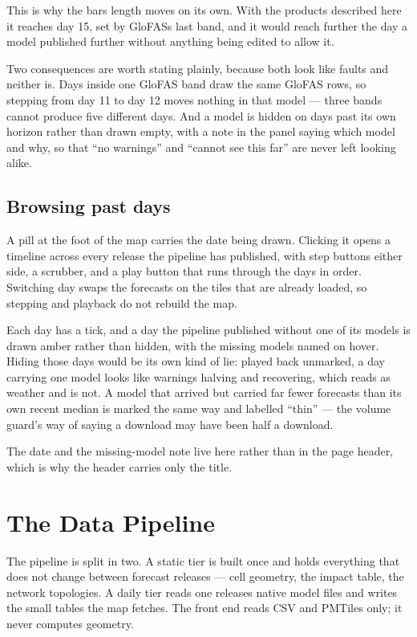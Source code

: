 This is why the bar\textquotesingle s length moves on its own.
With the products described here it reaches day 15, set by GloFAS\textquotesingle s last band, and it would reach further the day a model published further without anything being edited to allow it.

Two consequences are worth stating plainly, because both look like faults and neither is.
Days inside one GloFAS band draw the same GloFAS rows, so stepping from day 11 to day 12 moves nothing in that model --- three bands cannot produce five different days.
And a model is hidden on days past its own horizon rather than drawn empty, with a note in the panel saying which model and why, so that ``no warnings'' and ``cannot see this far'' are never left looking alike.

\subsection{Browsing past days}\label{browsing-past-days}

A pill at the foot of the map carries the date being drawn.
Clicking it opens a timeline across every release the pipeline has published, with step buttons either side, a scrubber, and a play button that runs through the days in order.
Switching day swaps the forecasts on the tiles that are already loaded, so stepping and playback do not rebuild the map.

Each day has a tick, and a day the pipeline published without one of its models is drawn amber rather than hidden, with the missing models named on hover.
Hiding those days would be its own kind of lie: played back unmarked, a day carrying one model looks like warnings halving and recovering, which reads as weather and is not.
A model that arrived but carried far fewer forecasts than its own recent median is marked the same way and labelled ``thin'' --- the volume guard's way of saying a download may have been half a download.

The date and the missing-model note live here rather than in the page header, which is why the header carries only the title.

\section{The Data Pipeline}\label{the-data-pipeline}

The pipeline is split in two.
A static tier is built once and holds everything that does not change between forecast releases --- cell geometry, the impact table, the network topologies.
A daily tier reads one release\textquotesingle s native model files and writes the small tables the map fetches.
The front end reads CSV and PMTiles only; it never computes geometry.


